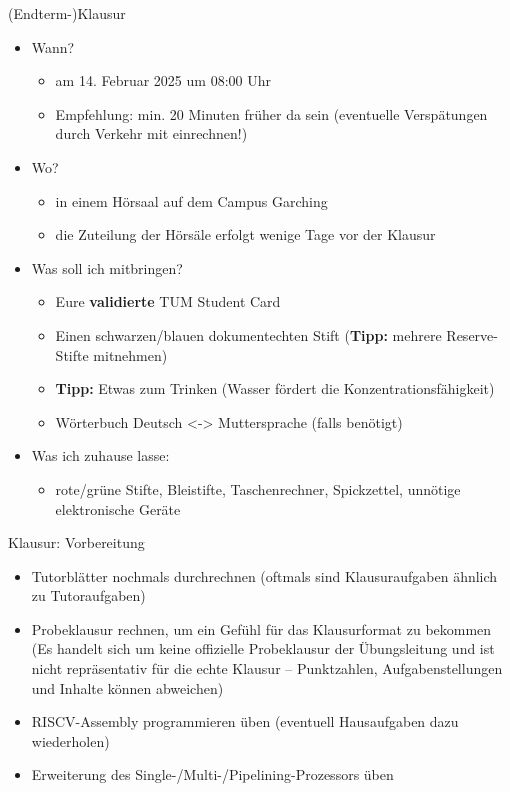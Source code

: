 \documentclass[
  german,            %
  aspectratio=169,    %
]{tumbeamer}
\begin{document}
\begin{frame}[c]{(Endterm-)Klausur}{}
	\begin{itemize}
		\item Wann?
		\begin{itemize}
			\item am 14. Februar 2025 um 08:00 Uhr
			\item Empfehlung: min. 20 Minuten früher da sein (eventuelle Verspätungen durch Verkehr mit einrechnen!)
		\end{itemize}
		\item Wo?
		\begin{itemize}
			\item in einem Hörsaal auf dem Campus Garching
			\item die Zuteilung der Hörsäle erfolgt wenige Tage vor der Klausur
		\end{itemize}
		\item Was soll ich mitbringen?
		\begin{itemize}
			\item Eure \textbf{validierte} TUM Student Card
			\item Einen schwarzen/blauen dokumentechten Stift (\textbf{Tipp:} mehrere Reserve-Stifte mitnehmen)
			\item \textbf{Tipp:} Etwas zum Trinken (Wasser fördert die Konzentrationsfähigkeit)
			\item Wörterbuch Deutsch <-> Muttersprache (falls benötigt)
		\end{itemize}
		\item Was ich zuhause lasse:
		\begin{itemize}
			\item rote/grüne Stifte, Bleistifte, Taschenrechner, Spickzettel, unnötige elektronische Geräte
		\end{itemize}
	\end{itemize}
\end{frame}

\begin{frame}[c]{Klausur: Vorbereitung}{}
	\begin{itemize}
		\item Tutorblätter nochmals durchrechnen (oftmals sind Klausuraufgaben ähnlich zu Tutoraufgaben)
		\item Probeklausur rechnen, um ein Gefühl für das Klausurformat zu bekommen (Es handelt sich um keine offizielle Probeklausur der Übungsleitung und ist nicht repräsentativ für die echte Klausur – Punktzahlen, Aufgabenstellungen und Inhalte können abweichen)
		\item RISCV-Assembly programmieren üben (eventuell Hausaufgaben dazu wiederholen)
		\item Erweiterung des Single-/Multi-/Pipelining-Prozessors üben
	\end{itemize}
\end{frame}
\end{document}
